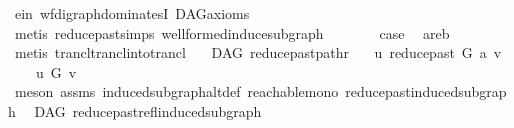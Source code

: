\begin{isabellebody}
\ e{\isacharunderscore}{\kern0pt}in{}\ wf{\isacharunderscore}{\kern0pt}digraph{\isachardot}{\kern0pt}dominatesI\ DAG{\isacharunderscore}{\kern0pt}axioms\isanewline
\ \ \ \ \isamarkupfalse%
\ {\isacharparenleft}{\kern0pt}metis\ reduce{\isacharunderscore}{\kern0pt}past{\isachardot}{\kern0pt}simps\ wellformed{\isacharunderscore}{\kern0pt}induce{\isacharunderscore}{\kern0pt}subgraph{\isacharparenright}{\kern0pt}\ \ \isanewline
\ \ \isamarkupfalse%
\ \isamarkupfalse%
\ {\isacharquery}{\kern0pt}case\ \isamarkupfalse%
\ a{}{\isacharunderscore}{\kern0pt}re{\isacharunderscore}{\kern0pt}b\isanewline
\ \ \ \ \isamarkupfalse%
\ {\isacharparenleft}{\kern0pt}metis\ trancl{\isachardot}{\kern0pt}trancl{\isacharunderscore}{\kern0pt}into{\isacharunderscore}{\kern0pt}trancl{\isacharparenright}{\kern0pt}\ \isanewline
{}\isamarkupfalse%
%
\endisatagproof
{\isafoldproof}%
%
\isadelimproof
\isanewline
%
\endisadelimproof
\isanewline
\isanewline
\isanewline
{}\isamarkupfalse%
\ {\isacharparenleft}{\kern0pt}\ DAG{\isacharparenright}{\kern0pt}\ reduce{\isacharunderscore}{\kern0pt}past{\isacharunderscore}{\kern0pt}pathr{\isacharcolon}{\kern0pt}\isanewline
\ \ \ {\isachardoublequoteopen}u\ {\isasymrightarrow}\isactrlsup {\isacharasterisk}{\kern0pt}\isactrlbsub reduce{\isacharunderscore}{\kern0pt}past\ G\ a\isactrlesub \ v{\isachardoublequoteclose}\ \isanewline
\ \ \ {\isachardoublequoteopen}\ u\ {\isasymrightarrow}\isactrlsup {\isacharasterisk}{\kern0pt}\isactrlbsub G\isactrlesub \ v{\isachardoublequoteclose}\isanewline
%
\isadelimproof
\ \ %
\endisadelimproof
%
\isatagproof
{}\isamarkupfalse%
\ {\isacharparenleft}{\kern0pt}meson\ assms\ induced{\isacharunderscore}{\kern0pt}subgraph{\isacharunderscore}{\kern0pt}altdef\ reachable{\isacharunderscore}{\kern0pt}mono\ reduce{\isacharunderscore}{\kern0pt}past{\isacharunderscore}{\kern0pt}induced{\isacharunderscore}{\kern0pt}subgraph{\isacharparenright}{\kern0pt}%
\endisatagproof
{\isafoldproof}%
%
\isadelimproof
%
\endisadelimproof
%
\isadelimdocument
%
\endisadelimdocument
%
\isatagdocument
%
\isamarkuptrue%
%
\endisatagdocument
{\isafolddocument}%
%
\isadelimdocument
%
\endisadelimdocument
{}\isamarkupfalse%
\ {\isacharparenleft}{\kern0pt}\ DAG{\isacharparenright}{\kern0pt}\ reduce{\isacharunderscore}{\kern0pt}past{\isacharunderscore}{\kern0pt}refl{\isacharunderscore}{\kern0pt}induced{\isacharunderscore}{\kern0pt}subgraph{\isacharcolon}{\kern0pt}\isanewline

\end{isabellebody}
